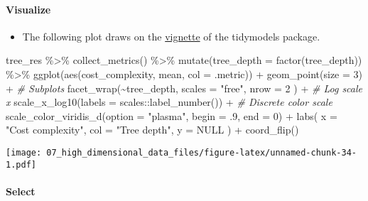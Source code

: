 \documentclass[
]{book}
\newenvironment{Shaded}{\begin{snugshade}}{\end{snugshade}}
\newcommand{\AttributeTok}[1]{\textcolor[rgb]{0.77,0.63,0.00}{#1}}
\newcommand{\CommentTok}[1]{\textcolor[rgb]{0.56,0.35,0.01}{\textit{#1}}}
\newcommand{\ConstantTok}[1]{\textcolor[rgb]{0.00,0.00,0.00}{#1}}
\newcommand{\DecValTok}[1]{\textcolor[rgb]{0.00,0.00,0.81}{#1}}
\newcommand{\FunctionTok}[1]{\textcolor[rgb]{0.00,0.00,0.00}{#1}}
\newcommand{\NormalTok}[1]{#1}
\newcommand{\SpecialCharTok}[1]{\textcolor[rgb]{0.00,0.00,0.00}{#1}}
\newcommand{\StringTok}[1]{\textcolor[rgb]{0.31,0.60,0.02}{#1}}
\providecommand{\tightlist}{%
  \setlength{\itemsep}{0pt}\setlength{\parskip}{0pt}}
\begin{document}
\hypertarget{visualize-1}{%
\paragraph{Visualize}\label{visualize-1}}

\begin{itemize}
\tightlist
\item
  The following plot draws on the \href{https://www.tidymodels.org/start/tuning/}{vignette} of the tidymodels package.
\end{itemize}

\begin{Shaded}
\begin{Highlighting}[]
\NormalTok{tree\_res }\SpecialCharTok{\%\textgreater{}\%}
  \FunctionTok{collect\_metrics}\NormalTok{() }\SpecialCharTok{\%\textgreater{}\%}
  \FunctionTok{mutate}\NormalTok{(}\AttributeTok{tree\_depth =} \FunctionTok{factor}\NormalTok{(tree\_depth)) }\SpecialCharTok{\%\textgreater{}\%}
  \FunctionTok{ggplot}\NormalTok{(}\FunctionTok{aes}\NormalTok{(cost\_complexity, mean, }\AttributeTok{col =}\NormalTok{ .metric)) }\SpecialCharTok{+}
  \FunctionTok{geom\_point}\NormalTok{(}\AttributeTok{size =} \DecValTok{3}\NormalTok{) }\SpecialCharTok{+}
  \CommentTok{\# Subplots}
  \FunctionTok{facet\_wrap}\NormalTok{(}\SpecialCharTok{\textasciitilde{}}\NormalTok{tree\_depth,}
    \AttributeTok{scales =} \StringTok{"free"}\NormalTok{,}
    \AttributeTok{nrow =} \DecValTok{2}
\NormalTok{  ) }\SpecialCharTok{+}
  \CommentTok{\# Log scale x}
  \FunctionTok{scale\_x\_log10}\NormalTok{(}\AttributeTok{labels =}\NormalTok{ scales}\SpecialCharTok{::}\FunctionTok{label\_number}\NormalTok{()) }\SpecialCharTok{+}
  \CommentTok{\# Discrete color scale}
  \FunctionTok{scale\_color\_viridis\_d}\NormalTok{(}\AttributeTok{option =} \StringTok{"plasma"}\NormalTok{, }\AttributeTok{begin =}\NormalTok{ .}\DecValTok{9}\NormalTok{, }\AttributeTok{end =} \DecValTok{0}\NormalTok{) }\SpecialCharTok{+}
  \FunctionTok{labs}\NormalTok{(}
    \AttributeTok{x =} \StringTok{"Cost complexity"}\NormalTok{,}
    \AttributeTok{col =} \StringTok{"Tree depth"}\NormalTok{,}
    \AttributeTok{y =} \ConstantTok{NULL}
\NormalTok{  ) }\SpecialCharTok{+}
  \FunctionTok{coord\_flip}\NormalTok{()}
\end{Highlighting}
\end{Shaded}

\texttt{[image: 07\_high\_dimensional\_data\_files/figure-latex/unnamed-chunk-34-1.pdf]}

\hypertarget{select-1}{%
\paragraph{Select}\label{select-1}}
\end{document}
